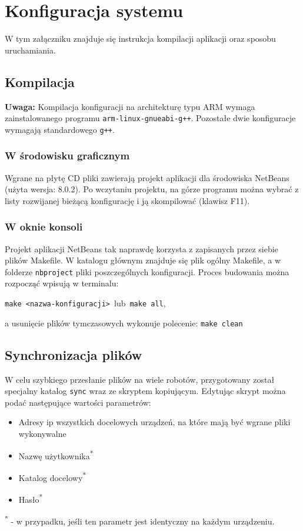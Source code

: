 \section{Konfiguracja systemu}
\label{ch:konfiguracja_systemu}

W tym załączniku znajduje się instrukcja kompilacji aplikacji oraz sposobu uruchamiania.

\subsection{Kompilacja}

\textbf{Uwaga:} Kompilacja konfiguracji na architekturę typu ARM wymaga zainstalowanego programu {\tt arm-linux-gnueabi-g++}. Pozostałe dwie konfiguracje wymagają standardowego {\tt g++}.

\subsubsection{W środowisku graficznym}

Wgrane na płytę CD pliki zawierają projekt aplikacji dla środowiska NetBeans (użyta wersja: 8.0.2). Po wczytaniu projektu, na górze programu można wybrać z listy rozwijanej bieżącą konfigurację i ją skompilować (klawisz F11).

\subsubsection{W oknie konsoli}

Projekt aplikacji NetBeans tak naprawdę korzysta z zapisanych przez siebie plików Makefile. W katalogu głównym znajduje się plik ogólny Makefile, a w folderze {\tt nbproject} pliki poszczególnych konfiguracji. Proces budowania można rozpocząć wpisują w terminalu:
\begin{center}
    {\tt make <nazwa-konfiguracji>}\  lub\
    {\tt make all},
\end{center}
a usunięcie plików tymczasowych wykonuje polecenie: {\tt make clean}

\subsection{Synchronizacja plików}

W celu szybkiego przesłanie plików na wiele robotów, przygotowany został specjalny katalog {\tt sync} wraz ze skryptem kopiującym. Edytując skrypt można podać następujące wartości parametrów:
\begin{itemize}
    \item Adresy ip wszystkich docelowych urządzeń, na które mają być wgrane pliki wykonywalne
    \item Nazwę użytkownika\textsuperscript{*}
    \item Katalog docelowy\textsuperscript{*}
    \item Hasło\textsuperscript{*}
\end{itemize}
\textsuperscript{*} - w przypadku, jeśli ten parametr jest identyczny na każdym urządzeniu.

